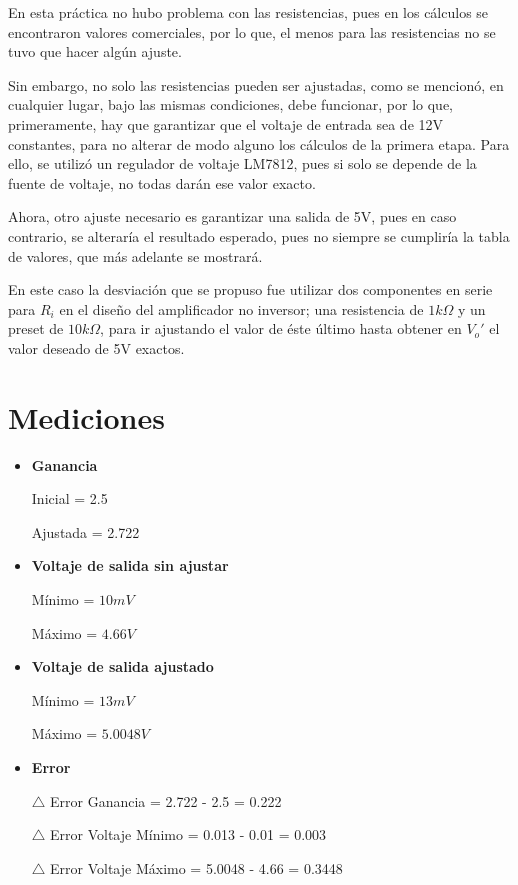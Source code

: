 \documentclass[12pt]{article}
\begin{document}
        En esta práctica no hubo problema con las resistencias, pues en los cálculos se encontraron valores comerciales, por lo que, el menos para las resistencias no se tuvo que hacer algún ajuste. 
        
        Sin embargo, no solo las resistencias pueden ser ajustadas, como se mencionó, en cualquier lugar, bajo las mismas condiciones, debe funcionar, por lo que, primeramente, hay que garantizar que el voltaje de entrada sea de 12V constantes, para no alterar de modo alguno los cálculos de la primera etapa. Para ello, se utilizó un regulador de voltaje LM7812, pues si solo se depende de la fuente de voltaje, no todas darán ese valor exacto.
        
        Ahora, otro ajuste necesario es garantizar una salida de 5V, pues en caso contrario, se alteraría el resultado esperado, pues no siempre se cumpliría la tabla de valores, que más adelante se mostrará. 
        
        En este caso la desviación que se propuso fue utilizar dos componentes en serie para $R_i$ en el diseño del amplificador no inversor; una resistencia de $1 k\Omega$ y un preset de $10 k\Omega$, para ir ajustando el valor de éste último hasta obtener en $V_{o}'$ el valor deseado de 5V exactos.

        
        
        
        
        
	\section{Mediciones}
		\begin{itemize}
			\item \textbf{Ganancia}
			
			    Inicial = 2.5
			    
			    Ajustada = 2.722
			\item \textbf{Voltaje de salida sin ajustar}
			    
			    Mínimo = $10 mV$
			    
			    Máximo = $4.66 V$
			\item \textbf{Voltaje de salida ajustado}
			    
			    Mínimo = $13 mV$
			    
			    Máximo = $5.0048 V$
			    
			\item \textbf{Error}
			
			    $\bigtriangleup$ Error Ganancia = 2.722 - 2.5 = 0.222
			    
			     $\bigtriangleup$ Error Voltaje Mínimo = 0.013 - 0.01 = 0.003
			     
			    $\bigtriangleup$ Error Voltaje Máximo = 5.0048 - 4.66 = 0.3448
		\end{itemize}
	
\end{document}

